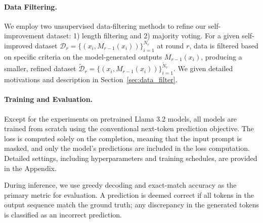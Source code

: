 \paragraph{Data Filtering. }
We employ two unsupervised data-filtering methods to refine our self-improvement dataset: 1) length filtering and 2) majority voting.  For a given self-improved dataset \( \mathcal{D}_r = \{(x_i, M_{r-1}(x_i))\}_{i=1}^{N_r} \) at round \( r \), data is filtered based on specific criteria on the model-generated outputs \( M_{r-1}(x_i) \), producing a smaller, refined dataset \( \tilde{\mathcal{D}}_r = \{(x_i, M_{r-1}(x_i))\}_{i=1}^{\tilde{N}_r} \). We given detailed motivations and description in Section~\ref{sec:data_filter}. 



\paragraph{Training and Evaluation. } Except for the experiments on pretrained Llama 3.2 models, all models are trained from scratch using the conventional next-token prediction objective. The loss is computed solely on the completion, meaning that the input prompt is masked, and only the model's predictions are included in the loss computation. Detailed settings, including hyperparameters and training schedules, are provided in the Appendix.

During inference, we use greedy decoding and exact-match accuracy as the primary metric for evaluation. A prediction is deemed correct if all tokens in the output sequence match the ground truth; any discrepancy in the generated tokens is classified as an incorrect prediction.